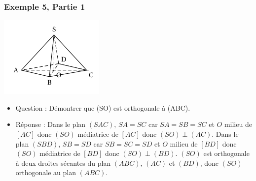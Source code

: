 \documentclass[xcolor=svgnames,t,final]{beamer}
\begin{document}
\begin{frame}

\label{exemple5}

\frametitle{Exemple 5, Partie 1}


\begin{center}
\includegraphics[scale=0.5]{images/exemple5.png}
\end{center}

\begin{itemize}
\pause \item {\color{blue} Question : Démontrer
que  (SO) est orthogonale à (ABC).}
\pause \item {\color{red} Réponse :  Dans le plan $(SAC)$, $SA=SC$  car $SA=SB=SC$ et $O$ milieu de $[AC]$ donc $(SO)$ médiatrice de $[AC]$ donc $(SO) \perp (AC)$. Dans le plan $(SBD)$, $SB=SD$  car $SB=SC=SD$ et $O$ milieu de $[BD]$ donc $(SO)$ médiatrice de $[BD]$ donc $(SO) \perp (BD)$. $(SO)$ est orthogonale à deux droites sécantes du plan  $(ABC)$,  $(AC)$ et $(BD)$, donc $(SO)$ orthogonale au plan $(ABC)$.
}
\end{itemize}



\end{frame}
\end{document}
